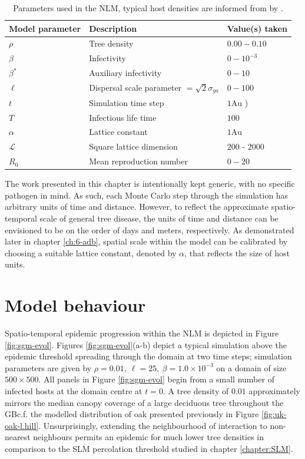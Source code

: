 \begin{table}
\centering
\begin{tabular}{l l l}
\hline
\textbf{Model parameter} & \textbf{Description} & \textbf{Value(s) taken}\\
\hline
$\rho$  & Tree density & $0.00 - 0.10$ \\ 
$\beta$ & Infectivity & $0 - 10^{-3}$ \\
$\beta^*$ & Auxiliary infectivity & $0 - 10$ \\
$\ell$ & Dispersal scale parameter $=\sqrt{2}\sigma_{ga}$ & $ 0 - 100$ \\
$t$ & Simulation time step & $1 \mathrm{Au}$ )\\
$T$ & Infectious life time & $100$  \\
$\alpha$ & Lattice constant & $1 \mathrm{Au}$ \\
$\mathcal{L}$ & Square lattice dimension & $200$ - $2000$ \\
$R_0$ & Mean reproduction number & $0-20$ \\
\hline
\end{tabular}
\caption{Parameters used in the NLM, typical host densities are informed from by \cite{hill.data}.}
\label{tab:SIR-model}
\end{table}

The work presented in this chapter is intentionally kept generic, with no specific pathogen in mind.
As such, each Monte Carlo step through the simulation has arbitrary units of time and distance.
However, to reflect the approximate spatio-temporal scale of general tree disease, the units of time and distance can be envisioned to be on the order of days and meters, respectively.
As demonstrated later in chapter \ref{ch:6-adb}, spatial scale within the model can be calibrated by choosing a suitable lattice constant, denoted by $\alpha$, that reflects the size of host units.

\section{Model behaviour}

Spatio-temporal epidemic progression within the NLM is depicted in Figure \ref{fig:sgm-evol}.
Figures \ref{fig:sgm-evol}(a-b) depict a typical simulation above the epidemic threshold spreading through the domain at two time steps;
simulation parameters are given by $\rho=0.01,\ \ell = 25,\ \beta = 1.0 \times 10^{-3}$ on a domain of size $500 \times 500$.
All panels in Figure \ref{fig:sgm-evol} begin from a small number of infected hosts at the domain centre at $t=0$.
A tree density of $0.01$ approximately mirrors the median canopy coverage of a large deciduous tree throughout the GB\textemdash c.f. the modelled distribution of oak presented previously in Figure \ref{fig:uk-oak-l.hill}.
Unsurprisingly, extending the neighbourhood of interaction to non-nearest neighbours permits an epidemic for much lower tree densities in comparison to the SLM percolation threshold studied in chapter \ref{chapter:SLM}.

